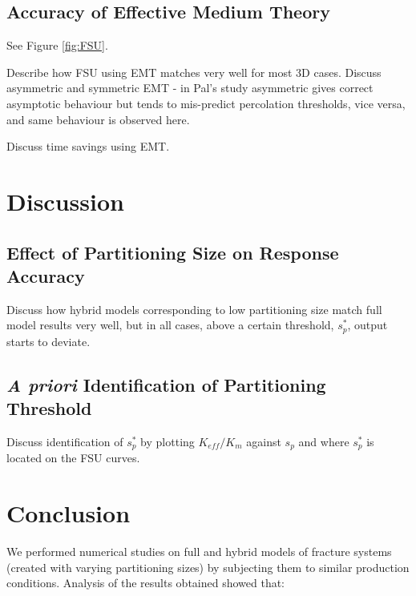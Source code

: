 \documentclass[a4paper]{article}
\begin{document}
\subsection{Accuracy of Effective Medium Theory}
See Figure \ref{fig:FSU}.

Describe how FSU using EMT matches very well for most 3D cases. Discuss asymmetric and symmetric EMT - in Pal's study asymmetric gives correct asymptotic behaviour but tends to mis-predict percolation thresholds, vice versa, and same behaviour is observed here.

Discuss time savings using EMT.

\section{Discussion}
\subsection{Effect of Partitioning Size on Response Accuracy}
Discuss how hybrid models corresponding to low partitioning size match full model results very well, but in all cases, above a certain threshold, $s_p^*$, output starts to deviate.

\subsection{\textit{A priori} Identification of Partitioning Threshold}
Discuss identification of $s_p^*$ by plotting $K_{eff}/K_m$ against $s_p$ and where $s_p^*$ is located on the FSU curves.

\section{Conclusion}
We performed numerical studies on full and hybrid models of fracture systems (created with varying partitioning sizes) by subjecting them to similar production conditions. Analysis of the results obtained showed that:
\end{document}
